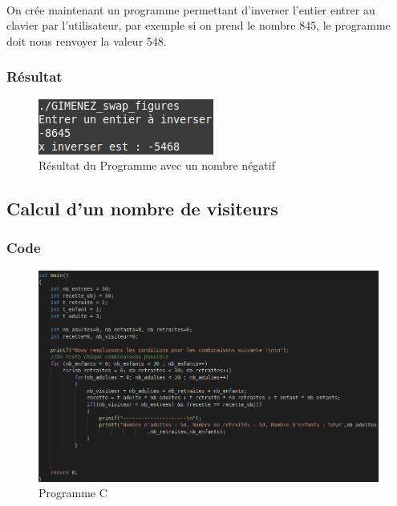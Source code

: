 \documentclass[10pt,a4paper]{article}
\begin{document}
\paragraph{}
On crée maintenant un programme permettant d'inverser l'entier entrer au clavier par l'utilisateur, 
par exemple si on prend le nombre 845, le programme doit nous renvoyer la valeur 548.
\subsubsection{Résultat}
\begin{figure}[h]
\begin{center}
\includegraphics[scale=.3]{images/swap_ex}
\end{center}
\caption{Résultat du Programme avec un nombre négatif}
\end{figure}

\subsection{Calcul d'un nombre de visiteurs}
\subsubsection{Code}
\begin{figure}[h]
\begin{center}
\includegraphics[scale=.3]{images/visiteurs_c}
\end{center}
\caption{Programme C}
\end{figure}
\end{document}
